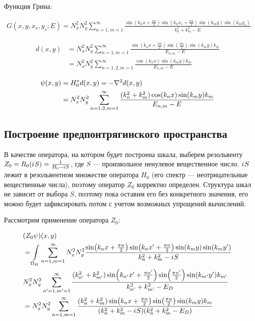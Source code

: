 Функция Грина:

\begin{align*}
G(x, y, x_s, y_s; E) = N_x^2 N_y^2 \sum\limits_{n = 1, m = 1}^\infty \frac{\sin(k_n x + \frac{\pi n}{2}) \sin(k_n x_s  + \frac{\pi n}{2}) \sin(k_m y) \sin(k_m y_s)}{k_n^2 + k_m^2 - E}
\end{align*}

\begin{align*}
d(x, y)
&= N_x^2 N_y^2 \sum\limits_{n = 1, m = 1}^\infty \frac{\sin(k_n x + \frac{\pi n}{2}) \sin(\frac{\pi n}{2}) \sin(k_m y) k_m}{E_{n, m} - E} \\
& = N_x^2 N_y^2 \sum\limits_{n = 1,2, m = 1}^\infty \frac{\cos(k_n x) \sin(k_m y) k_m}{E_{n, m} - E}
\end{align*}

\begin{align*}
\psi(x, y)
& = H_0^* d(x, y) = - \laplacian d(x, y) \\
& = N_x^2 N_y^2 \sum\limits_{n = 1,2, m = 1}^\infty \frac{(k_n^2 + k_m^2) \cos(k_n x) \sin(k_m y) k_m}{E_{n, m} - E}
\end{align*}

\subsection{Построение предпонтрягинского пространства}
В качестве оператора, на котором будет построена шкала, выберем резольвенту $Z_0 = R_0({i\mkern1mu} S) = \frac{1}{H_0 - {i\mkern1mu} S}$, где $S$ — произвольное ненулевое вещественное число. ${i\mkern1mu} S$ лежит в резольвентном множестве оператора $H_0$ (его спектр — неотрицательные вещественные числа), поэтому оператор $Z_0$ корректно определен. Структура шкал не зависит от выбора $S$, поэтому пока оставим его без конкретного значения, его можно будет зафиксировать потом с учетом возможных упрощений вычислений.


Рассмотрим применение оператора $Z_0$:

\begin{align*}
& (Z_0 \psi)(x, y) \\
&= \int\limits_{\Omega_R} \sum\limits_{n = 1, m = 1}^\infty N_x^2 N_y^2 \frac{\sin(k_n x + \frac{\pi n}{2}) \sin(k_n x' + \frac{\pi n}{2}) \sin(k_m y) \sin(k_m y')}{k^2_n + k^2_m - {i\mkern1mu} S} \\
& N_x^2 N_y^2 \sum\limits_{n' = 1, m' = 1}^\infty \frac{(k_{n'}^2 + k_{m'}^2) \sin(k_{n'} x' + \frac{\pi n'}{2}) \sin(\frac{\pi n'}{2}) \sin(k_{m'} y') k_{m'}}{k_{n'}^2 + k_{m'}^2 - E_D} \\
&= N_x^2 N_y^2 \sum\limits_{n = 1, m = 1}^\infty \frac{(k_n^2 + k_m^2) \sin(k_n x + \frac{\pi n}{2}) \sin(\frac{\pi n}{2}) \sin(k_m y) k_m}{(k_n^2 + k_m^2 - {i\mkern1mu} S) (k_n^2 + k_m^2 - E_D)}
\end{align*}

